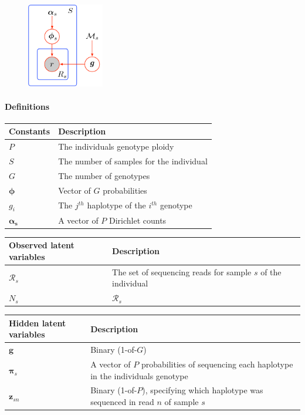 \documentclass{article}
\begin{document}
\begin{figure}[ht]
    \centering
    \includegraphics[width=0.3\textwidth]{figures/subclone_model}
\end{figure}

\paragraph{Definitions}

\begin{center}
\begin{tabular}{ll}
Constants & Description \\
\hline
$P$ & The individuals genotype ploidy \\
$S$ & The number of samples for the individual \\
$G$ & The number of genotypes \\
$\boldsymbol{\phi}$ & Vector of $G$ probabilities \\
$g_{i}$ & The $j^{th}$ haplotype of the $i^{th}$ genotype \\
$\boldsymbol{\alpha_s}$ & A vector of $P$ Dirichlet counts \\
\hline
\end{tabular}
\end{center}

\begin{center}
\begin{tabular}{ll}
Observed latent variables & Description \\
\hline
$\mathcal{R}_s$ & The set of sequencing reads for sample $s$ of the individual \\
$N_s$ & $\mathcal{R}_s$ \\
\hline
\end{tabular}
\end{center}

\begin{center}
\begin{tabular}{ll}
Hidden latent variables & Description \\
\hline
$\boldsymbol{g}$ & Binary (1-of-$G$) \\
$\boldsymbol{\pi}_s$ & A vector of $P$ probabilities of sequencing each haplotype in the individuals genotype \\
$\boldsymbol{z}_{sn}$ & Binary (1-of-$P$), specifying which haplotype was sequenced in read $n$ of sample $s$ \\
\hline
\end{tabular}
\end{center}
\end{document}
